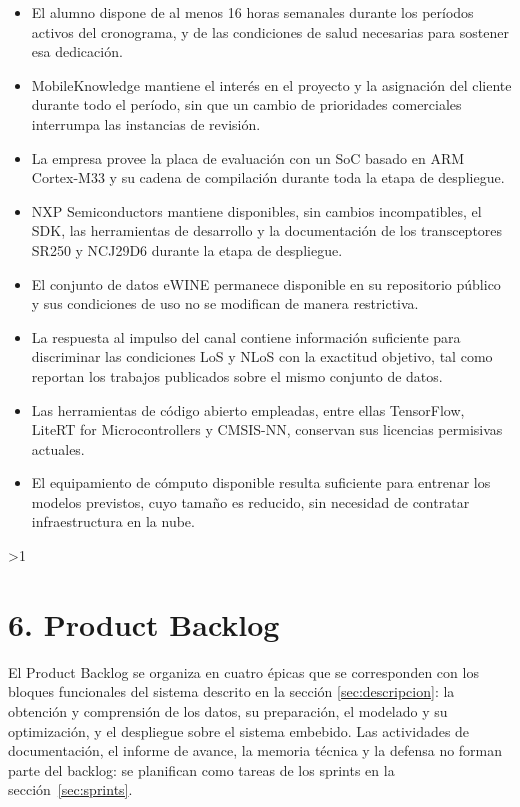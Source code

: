 \documentclass[
11pt, %
]{charter}
\providecommand{\revision}{1}
\begin{document}
\begin{itemize}
    \item El alumno dispone de al menos 16 horas semanales durante los períodos activos del cronograma, y de las condiciones de salud necesarias para sostener esa dedicación.
    \item MobileKnowledge mantiene el interés en el proyecto y la asignación del cliente durante todo el período, sin que un cambio de prioridades comerciales interrumpa las instancias de revisión.
    \item La empresa provee la placa de evaluación con un SoC basado en ARM Cortex-M33 y su cadena de compilación durante toda la etapa de despliegue.
    \item NXP Semiconductors mantiene disponibles, sin cambios incompatibles, el SDK, las herramientas de desarrollo y la documentación de los transceptores SR250 y NCJ29D6 durante la etapa de despliegue.
    \item El conjunto de datos eWINE permanece disponible en su repositorio público y sus condiciones de uso no se modifican de manera restrictiva.
    \item La respuesta al impulso del canal contiene información suficiente para discriminar las condiciones LoS y NLoS con la exactitud objetivo, tal como reportan los trabajos publicados sobre el mismo conjunto de datos.
    \item Las herramientas de código abierto empleadas, entre ellas TensorFlow, LiteRT for Microcontrollers y CMSIS-NN, conservan sus licencias permisivas actuales.
    \item El equipamiento de cómputo disponible resulta suficiente para entrenar los modelos previstos, cuyo tamaño es reducido, sin necesidad de contratar infraestructura en la nube.
\end{itemize}

\ifnum\revision>1
\section{6. Product Backlog}
\label{sec:backlog}

El Product Backlog se organiza en cuatro épicas que se corresponden con los bloques funcionales del sistema descrito en la sección \ref{sec:descripcion}: la obtención y comprensión de los datos, su preparación, el modelado y su optimización, y el despliegue sobre el sistema embebido. Las actividades de documentación, el informe de avance, la memoria técnica y la defensa no forman parte del backlog: se planifican como tareas de los sprints en la sección~\ref{sec:sprints}.
\end{document}
